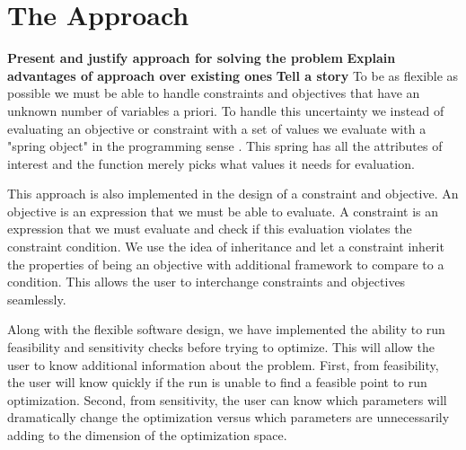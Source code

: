 \documentclass[10pt]{article}
\begin{document}
\section{The Approach}
\label{sec:Approach}

\textbf{Present and justify approach for solving the problem}
\textbf{Explain advantages of approach over existing ones}
\textbf{Tell a story}
To be as flexible as possible we must be able to handle constraints and objectives that have an unknown number of  variables a priori. To handle this uncertainty we instead of evaluating an objective or constraint with a set of values we evaluate with a "spring object" in the programming sense \cite{OOP}. This spring has all the attributes of interest and the function merely picks what values it needs for evaluation. 

This approach is also implemented in the design of a constraint and objective. An objective is an expression that we must be able to evaluate. A constraint is an expression that we must evaluate and check if this evaluation violates the constraint condition. We use the idea of inheritance and let a constraint inherit the properties of being an objective with additional framework to compare to a condition. This allows the user to interchange constraints and objectives seamlessly.

Along with the flexible software design, we have implemented the ability to run feasibility and sensitivity checks before trying to optimize. This will allow the user to know additional information about the problem. First, from feasibility, the user will know quickly if the run is unable to find a feasible point to run optimization. Second, from sensitivity, the user can know which parameters will dramatically change the optimization versus which parameters are unnecessarily adding to the dimension of the optimization space. 
 
\end{document}
